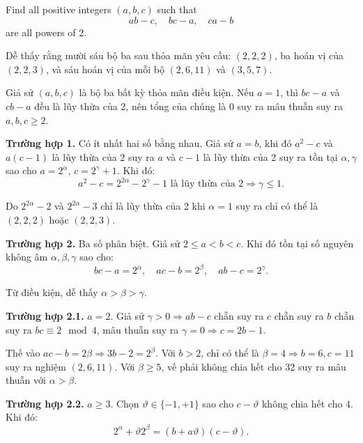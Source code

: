 \ifshowproblemandsoln
\ifshowproblem\begin{problem}\label{problem:IMO-2015-P2}\fi
\ifshowsoln\begin{problem}\fi
    Find all positive integers $(a,b,c)$ such that
    $$ab-c,\quad bc-a,\quad ca-b$$are all powers of $2$.
\end{problem}
\fi

\ifshowsoln
\begin{soln}\footnotemark
    Dễ thấy rằng mười sáu bộ ba sau thỏa mãn yêu cầu: \( (2, 2, 2) \), ba hoán vị của \( (2, 2, 3) \), và sáu hoán vị của mỗi bộ \( (2, 6, 11) \) và \( (3, 5, 7) \).

    Giả sử \( (a, b, c) \) là bộ ba bất kỳ thỏa mãn điều kiện. Nếu \( a = 1 \), thì \( bc - a \) và \( cb - a \) đều là lũy thừa của 2,
    nên tổng của chúng là 0 suy ra mâu thuẫn suy ra \( a, b, c \ge 2 \).

    \textbf{Trường hợp 1.} Có ít nhất hai số bằng nhau. Giả sử \( a = b \), khi đó \( a^2 - c \) và \( a(c - 1) \) là lũy thừa của 2
    suy ra \( a \) và \( c - 1 \) là lũy thừa của 2 suy ra tồn tại \( \alpha, \gamma \) sao cho \( a = 2^\alpha \), \( c = 2^\gamma + 1 \). Khi đó:
    \[
        a^2 - c = 2^{2\alpha} - 2^\gamma - 1 \text{ là lũy thừa của 2} \Rightarrow \gamma \le 1.
    \]

    Do \( 2^{2\alpha} - 2 \) và \( 2^{2\alpha} - 3 \) chỉ là lũy thừa của 2 khi \( \alpha = 1 \) suy ra chỉ có thể là \( (2, 2, 2) \) hoặc \( (2, 2, 3) \).

    \textbf{Trường hợp 2.} Ba số phân biệt. Giả sử \( 2 \le a < b < c \). Khi đó tồn tại số nguyên không âm \( \alpha, \beta, \gamma \) sao cho:
    \[
        bc - a = 2^\alpha, \quad ac - b = 2^\beta, \quad ab - c = 2^\gamma.
    \]

    Từ điều kiện, dễ thấy \( \alpha > \beta > \gamma \).

    \textbf{Trường hợp 2.1.} \( a = 2 \). Giả sử \( \gamma > 0 \Rightarrow ab - c \) chẵn suy ra \( c \) chẵn
    suy ra \( b \) chẵn suy ra \( bc \equiv 2 \mod 4 \), mâu thuẫn suy ra \( \gamma = 0 \Rightarrow c = 2b - 1 \).

    Thế vào \( ac - b = 2\beta \Rightarrow 3b - 2 = 2^\beta \). Với \( b > 2 \), chỉ có thể là \( \beta = 4 \Rightarrow b = 6, c = 11 \)
    suy ra nghiệm \( (2, 6, 11) \). Với \( \beta \ge 5 \), vế phải không chia hết cho 32 suy ra mâu thuẫn với \( \alpha > \beta \).

    \textbf{Trường hợp 2.2.} \( a \ge 3 \). Chọn \( \vartheta \in \{-1, +1\} \) sao cho \( c - \vartheta \) không chia hết cho 4. Khi đó:
    \[
        2^\alpha + \vartheta 2^\beta = (b + a\vartheta)(c - \vartheta).
    \]
    

\end{soln}
\end{problem}
